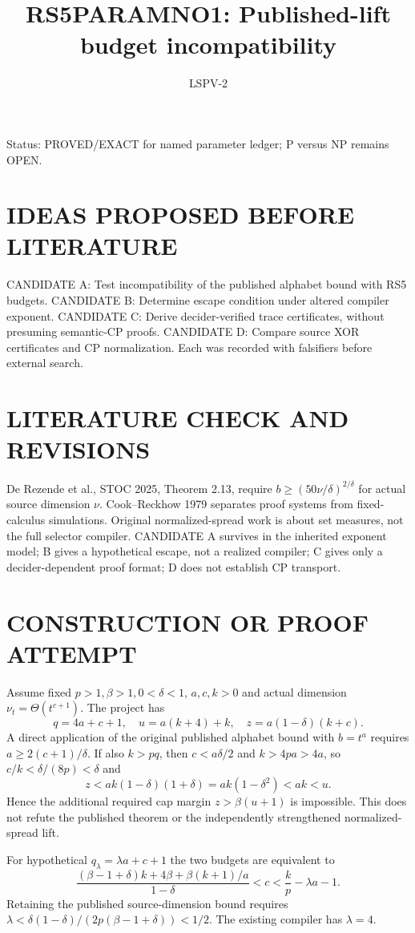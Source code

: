 \documentclass{article}
\title{RS5PARAMNO1: Published-lift budget incompatibility}
\author{LSPV-2}
\begin{document}
\maketitle
\noindent Status: PROVED/EXACT for named parameter ledger; P versus NP remains OPEN.
\section{IDEAS PROPOSED BEFORE LITERATURE}
CANDIDATE A: Test incompatibility of the published alphabet bound with RS5 budgets. CANDIDATE B: Determine escape condition under altered compiler exponent. CANDIDATE C: Derive decider-verified trace certificates, without presuming semantic-CP proofs. CANDIDATE D: Compare source XOR certificates and CP normalization. Each was recorded with falsifiers before external search.
\section{LITERATURE CHECK AND REVISIONS}
De Rezende et al., STOC 2025, Theorem 2.13, require $b\ge(50\nu/\delta)^{2/\delta}$ for actual source dimension $\nu$. Cook--Reckhow 1979 separates proof systems from fixed-calculus simulations. Original normalized-spread work is about set measures, not the full selector compiler. CANDIDATE A survives in the inherited exponent model; B gives a hypothetical escape, not a realized compiler; C gives only a decider-dependent proof format; D does not establish CP transport.
\section{CONSTRUCTION OR PROOF ATTEMPT}
Assume fixed $p>1,\beta>1,0<\delta<1$, $a,c,k>0$ and actual dimension $\nu_t=\Theta(t^{c+1})$. The project has
\[
q=4a+c+1,\quad u=a(k+4)+k,\quad z=a(1-\delta)(k+c).
\]
A direct application of the original published alphabet bound with $b=t^a$ requires $a\ge2(c+1)/\delta$. If also $k>pq$, then $c<a\delta/2$ and $k>4pa>4a$, so $c/k<\delta/(8p)<\delta$ and
\[
z<ak(1-\delta)(1+\delta)=ak(1-\delta^2)<ak<u.
\]
Hence the additional required cap margin $z>\beta(u+1)$ is impossible. This does not refute the published theorem or the independently strengthened normalized-spread lift.

For hypothetical $q_\lambda=\lambda a+c+1$ the two budgets are equivalent to
\[
\frac{(\beta-1+\delta)k+4\beta+\beta(k+1)/a}{1-\delta}
<c<\frac{k}{p}-\lambda a-1.
\]
Retaining the published source-dimension bound requires
$\lambda<\delta(1-\delta)/(2p(\beta-1+\delta))<1/2$. The existing compiler has $\lambda=4$.
\end{document}
